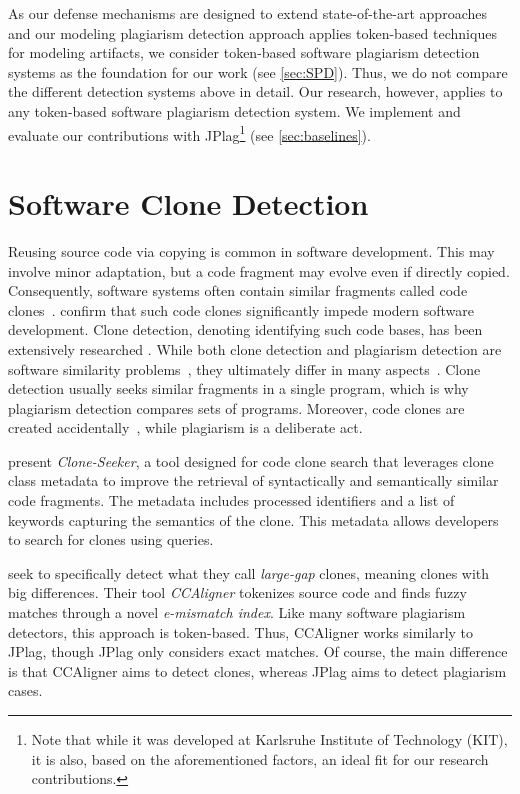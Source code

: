 As our defense mechanisms are designed to extend state-of-the-art approaches and our modeling plagiarism detection approach applies token-based techniques for modeling artifacts, we consider token-based software plagiarism detection systems as the foundation for our work (see \autoref{sec:SPD}). Thus, we do not compare the different detection systems above in detail.
Our research, however, applies to any token-based software plagiarism detection system. We implement and evaluate our contributions with JPlag\footnote{Note that while it was developed at Karlsruhe Institute of Technology (KIT), it is also, based on the aforementioned factors, an ideal fit for our research contributions.} (see \autoref{sec:baselines}).

\section{Software Clone Detection}\label{sec:rw-clone-detection}
Reusing source code via copying is common in software development. This may involve minor adaptation, but a code fragment may evolve even if directly copied. Consequently, software systems often contain similar fragments called code clones~\cite{Roy2009}.
\citet{juergens2009} confirm that such code clones significantly impede modern software development.
Clone detection, denoting identifying such code bases, has been extensively researched \cite{Shobha2021review, ain2019, rattan2013, Roy2009}.
While both clone detection and plagiarism detection are software similarity problems~\cite{Novak2019}, they ultimately differ in many aspects~\cite{mariani2012}.
Clone detection usually seeks similar fragments in a single program, which is why plagiarism detection compares sets of programs.
Moreover, code clones are created accidentally~\cite{juergens2009}, while plagiarism is a deliberate act.

\citet{Hammad2022} present \textit{Clone-Seeker}, a tool designed for code clone search that leverages clone class metadata to improve the retrieval of syntactically and semantically similar code fragments. The metadata includes processed identifiers and a list of keywords capturing the semantics of the clone. This metadata allows developers to search for clones using queries.

\citet{wang2018} seek to specifically detect what they call \emph{large-gap} clones, meaning clones with big differences. Their tool \textit{CCAligner} tokenizes source code and finds fuzzy matches through a novel \emph{e-mismatch index}. Like many software plagiarism detectors, this approach is token-based. 
Thus, CCAligner works similarly to JPlag, though JPlag only considers exact matches. Of course, the main difference is that CCAligner aims to detect clones, whereas JPlag aims to detect plagiarism cases.

